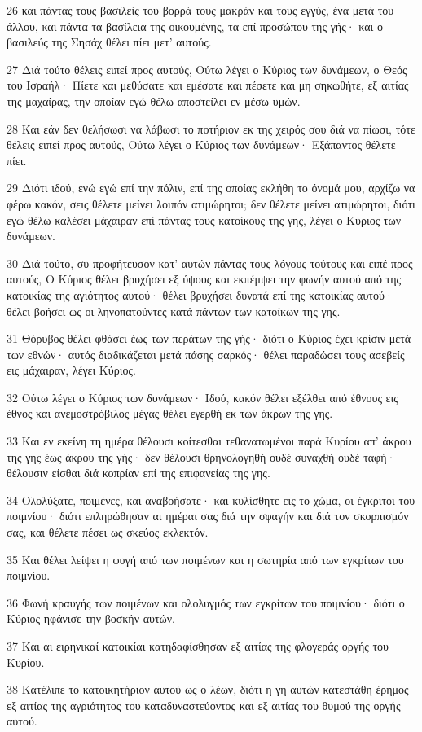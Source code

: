 \par 26 και πάντας τους βασιλείς του βορρά τους μακράν και τους εγγύς, ένα μετά του άλλου, και πάντα τα βασίλεια της οικουμένης, τα επί προσώπου της γής· και ο βασιλεύς της Σησάχ θέλει πίει μετ' αυτούς.
\par 27 Διά τούτο θέλεις ειπεί προς αυτούς, Ούτω λέγει ο Κύριος των δυνάμεων, ο Θεός του Ισραήλ· Πίετε και μεθύσατε και εμέσατε και πέσετε και μη σηκωθήτε, εξ αιτίας της μαχαίρας, την οποίαν εγώ θέλω αποστείλει εν μέσω υμών.
\par 28 Και εάν δεν θελήσωσι να λάβωσι το ποτήριον εκ της χειρός σου διά να πίωσι, τότε θέλεις ειπεί προς αυτούς, Ούτω λέγει ο Κύριος των δυνάμεων· Εξάπαντος θέλετε πίει.
\par 29 Διότι ιδού, ενώ εγώ επί την πόλιν, επί της οποίας εκλήθη το όνομά μου, αρχίζω να φέρω κακόν, σεις θέλετε μείνει λοιπόν ατιμώρητοι; δεν θέλετε μείνει ατιμώρητοι, διότι εγώ θέλω καλέσει μάχαιραν επί πάντας τους κατοίκους της γης, λέγει ο Κύριος των δυνάμεων.
\par 30 Διά τούτο, συ προφήτευσον κατ' αυτών πάντας τους λόγους τούτους και ειπέ προς αυτούς, Ο Κύριος θέλει βρυχήσει εξ ύψους και εκπέμψει την φωνήν αυτού από της κατοικίας της αγιότητος αυτού· θέλει βρυχήσει δυνατά επί της κατοικίας αυτού· θέλει βοήσει ως οι ληνοπατούντες κατά πάντων των κατοίκων της γης.
\par 31 Θόρυβος θέλει φθάσει έως των περάτων της γής· διότι ο Κύριος έχει κρίσιν μετά των εθνών· αυτός διαδικάζεται μετά πάσης σαρκός· θέλει παραδώσει τους ασεβείς εις μάχαιραν, λέγει Κύριος.
\par 32 Ούτω λέγει ο Κύριος των δυνάμεων· Ιδού, κακόν θέλει εξέλθει από έθνους εις έθνος και ανεμοστρόβιλος μέγας θέλει εγερθή εκ των άκρων της γης.
\par 33 Και εν εκείνη τη ημέρα θέλουσι κοίτεσθαι τεθανατωμένοι παρά Κυρίου απ' άκρου της γης έως άκρου της γής· δεν θέλουσι θρηνολογηθή ουδέ συναχθή ουδέ ταφή· θέλουσιν είσθαι διά κοπρίαν επί της επιφανείας της γης.
\par 34 Ολολύξατε, ποιμένες, και αναβοήσατε· και κυλίσθητε εις το χώμα, οι έγκριτοι του ποιμνίου· διότι επληρώθησαν αι ημέραι σας διά την σφαγήν και διά τον σκορπισμόν σας, και θέλετε πέσει ως σκεύος εκλεκτόν.
\par 35 Και θέλει λείψει η φυγή από των ποιμένων και η σωτηρία από των εγκρίτων του ποιμνίου.
\par 36 Φωνή κραυγής των ποιμένων και ολολυγμός των εγκρίτων του ποιμνίου· διότι ο Κύριος ηφάνισε την βοσκήν αυτών.
\par 37 Και αι ειρηνικαί κατοικίαι κατηδαφίσθησαν εξ αιτίας της φλογεράς οργής του Κυρίου.
\par 38 Κατέλιπε το κατοικητήριον αυτού ως ο λέων, διότι η γη αυτών κατεστάθη έρημος εξ αιτίας της αγριότητος του καταδυναστεύοντος και εξ αιτίας του θυμού της οργής αυτού.

